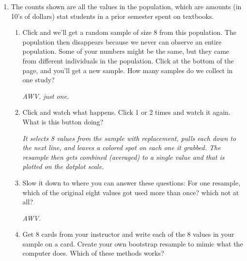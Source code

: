 \begin{enumerate}
  \item  The counts shown are all the values in the population, which
    are amounts (in 10's of dollars) stat students in a prior semester
    spent on textbooks.
    \begin{enumerate}
    \item  Click  and we'll get a random sample of size
      8 from this population.  The population then disappears because
      we never can observe an entire population. Some of your numbers
      might be the same, but they came from different individuals in
      the population.  Click  at the bottom of
      the page, and you'll get a new sample.  How many samples do 
       we collect in one study?
\begin{students}
        \vspace{1cm}        
\end{students}
\begin{key}
   {\it AWV. just one. }
\end{key}
    \item  Click  and watch what happens. Click
       1 or 2 times and watch it again.  What is this
      button doing?
\begin{students}
        \vspace{1cm}        
\end{students}
\begin{key}
   {\it It selects 8 values from the sample with replacement, pulls
    each down to the next line, and leaves a colored spot on each one
    it grabbed.  The resample then gets combined (averaged) to a
    single value and that is plotted on the dotplot scale.}
\end{key}
    \item  Slow it down to where you can answer these questions: For
      one resample, which of the original eight values got used more
      than once? which not at all?
\begin{students}
        \vspace{1cm}        
\end{students}
\begin{key}
   {\it AWV.}
\end{key}
    \item Get 8 cards from your instructor and write each of the 8 values in
      your sample on a card.  Create your own bootstrap resample to
      mimic what the computer does.  Which of these methods works?

\end{enumerate}
\end{enumerate}
